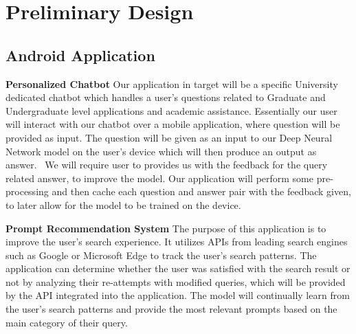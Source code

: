 \section{Preliminary Design}

    \subsection{Android Application}

        \textbf{Personalized Chatbot}
        Our application in target will be a specific University dedicated chatbot which handles a user's questions related to Graduate and Undergraduate level applications and academic assistance. Essentially our user will interact with our chatbot over a mobile application, where question will be provided as input. The question will be given as an input to our Deep Neural Network model on the user's device which will then produce an output as answer.~\cite{9225395} We will require user to provides us with the feedback for the query related answer, to improve the model. Our application will perform some pre-processing and then cache each question and answer pair with the feedback given, to later allow for the model to be trained on the device.\newline

        \textbf{Prompt Recommendation System}
        The purpose of this application is to improve the user's search experience. It utilizes 
        APIs from leading search engines such as Google or Microsoft Edge to track the user's 
        search patterns. The application can determine whether the user was satisfied with the 
        search result or not by analyzing their re-attempts with modified queries, which will be 
        provided by the API integrated into the application. The model will continually learn from 
        the user's search patterns and provide the most relevant prompts based on the main 
        category of their query. \newline

